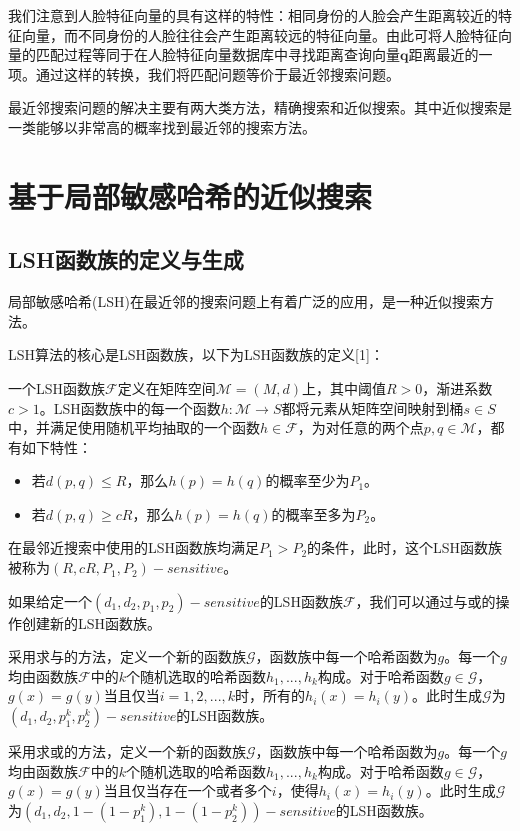 我们注意到人脸特征向量的具有这样的特性：相同身份的人脸会产生距离较近的特征向量，而不同身份的人脸往往会产生距离较远的特征向量。由此可将人脸特征向量的匹配过程等同于在人脸特征向量数据库中寻找距离查询向量$\mathbf{q}$距离最近的一项。通过这样的转换，我们将匹配问题等价于最近邻搜索问题。

最近邻搜索问题的解决主要有两大类方法，精确搜索和近似搜索。其中近似搜索是一类能够以非常高的概率找到最近邻的搜索方法。

\section{基于局部敏感哈希的近似搜索}

\subsection{LSH函数族的定义与生成}

局部敏感哈希(LSH)在最近邻的搜索问题上有着广泛的应用，是一种近似搜索方法。

LSH算法的核心是LSH函数族，以下为LSH函数族的定义[1]：

一个LSH函数族$\mathcal{F}$定义在矩阵空间$\mathcal{M}=(M,d)$上，其中阈值$R>0$，渐进系数$c>1$。LSH函数族中的每一个函数$h:\mathcal{M}\rightarrow S$都将元素从矩阵空间映射到桶$s\in S$中，并满足使用随机平均抽取的一个函数$h\in \mathcal{F}$，为对任意的两个点$p,q\in \mathcal{M}$，都有如下特性：

\begin{itemize}
	\item 若$d(p,q)\leq R$，那么$h(p)=h(q)$的概率至少为$P_1$。
	\item 若$d(p,q)\geq cR$，那么$h(p)=h(q)$的概率至多为$P_2$。
\end{itemize}

在最邻近搜索中使用的LSH函数族均满足$P_1>P_2$的条件，此时，这个LSH函数族被称为$(R,cR,P_1,P_2)-sensitive$。

如果给定一个$(d_1,d_2,p_1,p_2)-sensitive$的LSH函数族$\mathcal{F}$，我们可以通过与或的操作创建新的LSH函数族。

采用求与的方法，定义一个新的函数族$\mathcal{G}$，函数族中每一个哈希函数为$g$。每一个$g$均由函数族$\mathcal{F}$中的$k$个随机选取的哈希函数$h_1,...,h_k$构成。对于哈希函数$g\in \mathcal{G}$，$g(x)=g(y)$当且仅当$i=1,2,...,k$时，所有的$h_i(x)=h_i(y)$。此时生成$\mathcal{G}$为$(d_1,d_2,p_1^k,p_2^k)-sensitive$的LSH函数族。

采用求或的方法，定义一个新的函数族$\mathcal{G}$，函数族中每一个哈希函数为$g$。每一个$g$均由函数族$\mathcal{F}$中的$k$个随机选取的哈希函数$h_1,...,h_k$构成。对于哈希函数$g\in \mathcal{G}$，$g(x)=g(y)$当且仅当存在一个或者多个$i$，使得$h_i(x)=h_i(y)$。此时生成$\mathcal{G}$为$(d_1,d_2,1-(1-p_1^k),1-(1-p_2^k))-sensitive$的LSH函数族。

